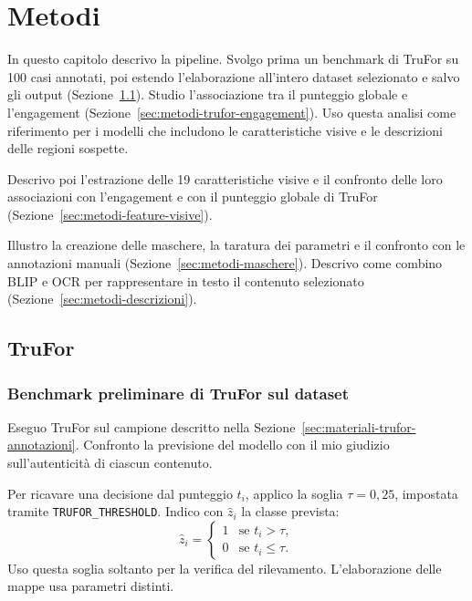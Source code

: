 
\chapter{Metodi}
\label{chap:metodi}

In questo capitolo descrivo la pipeline. Svolgo prima un benchmark di TruFor su 100 casi annotati, poi estendo l'elaborazione all'intero dataset selezionato e salvo gli output (Sezione~\ref{sec:metodi-trufor}). Studio l'associazione tra il punteggio globale e l'engagement (Sezione~\ref{sec:metodi-trufor-engagement}). Uso questa analisi come riferimento per i modelli che includono le caratteristiche visive e le descrizioni delle regioni sospette.

Descrivo poi l'estrazione delle 19 caratteristiche visive e il confronto delle loro associazioni con l'engagement e con il punteggio globale di TruFor (Sezione~\ref{sec:metodi-feature-visive}).

Illustro la creazione delle maschere, la taratura dei parametri e il confronto con le annotazioni manuali (Sezione~\ref{sec:metodi-maschere}). Descrivo come combino BLIP e OCR per rappresentare in testo il contenuto selezionato (Sezione~\ref{sec:metodi-descrizioni}).

\section{TruFor}
\label{sec:metodi-trufor}

\subsection{Benchmark preliminare di TruFor sul dataset}
\label{sec:metodi-trufor-benchmark}

Eseguo TruFor sul campione descritto nella Sezione~\ref{sec:materiali-trufor-annotazioni}. Confronto la previsione del modello con il mio giudizio sull'autenticità di ciascun contenuto.

Per ricavare una decisione dal punteggio $t_i$, applico la soglia $\tau=0{,}25$, impostata tramite \texttt{TRUFOR\_THRESHOLD}. Indico con $\widehat{z}_i$ la classe prevista:
\begin{equation}
    \widehat{z}_i =
    \begin{cases}
        1 & \text{se } t_i > \tau, \\
        0 & \text{se } t_i \leq \tau.
    \end{cases}
    \label{eq:metodi-trufor-soglia}
\end{equation}
Uso questa soglia soltanto per la verifica del rilevamento. L'elaborazione delle mappe usa parametri distinti.

